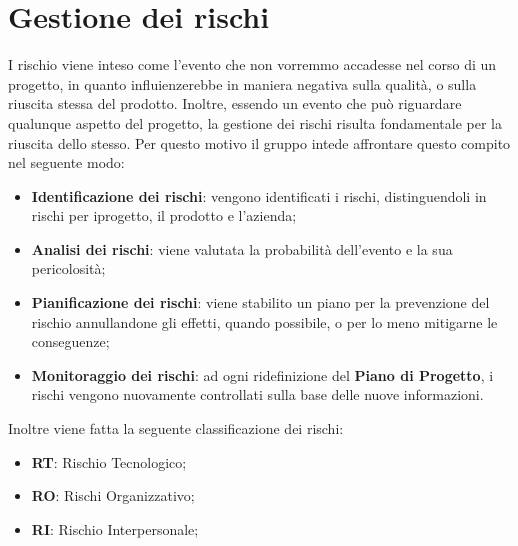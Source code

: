 \section{Gestione dei rischi}
I rischio viene inteso come l'evento che non vorremmo accadesse nel corso di un progetto, in quanto influienzerebbe in maniera negativa sulla qualità, o sulla riuscita stessa del prodotto. Inoltre, essendo un evento che può riguardare qualunque aspetto del progetto, la gestione dei rischi risulta fondamentale per la riuscita dello stesso. Per questo motivo il gruppo intede affrontare questo compito nel seguente modo:\\
\begin{itemize}
\item \textbf{Identificazione dei rischi}: vengono identificati i rischi, distinguendoli in rischi per iprogetto, il prodotto e l'azienda;
\item \textbf{Analisi dei rischi}: viene valutata la probabilità dell'evento e la sua pericolosità;
\item \textbf{Pianificazione dei rischi}: viene stabilito un piano per la prevenzione del rischio annullandone gli effetti, quando possibile, o per lo meno mitigarne le conseguenze;
\item \textbf{Monitoraggio dei rischi}: ad ogni ridefinizione del \textbf{Piano di Progetto}, i rischi vengono nuovamente controllati sulla base delle nuove informazioni.
\end{itemize}
Inoltre viene fatta la seguente classificazione dei rischi:
\begin{itemize}
\item \textbf{RT}: Rischio Tecnologico;
\item \textbf{RO}: Rischi Organizzativo;
\item \textbf{RI}: Rischio Interpersonale;
\end{itemize}


